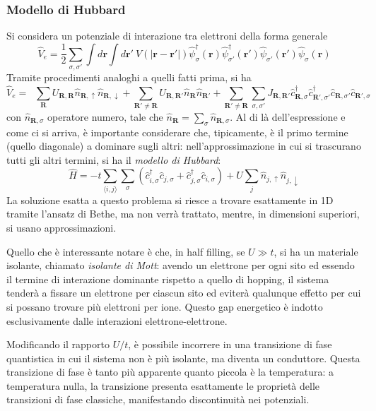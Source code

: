 \documentclass[11pt, a4paper]{scrartcl}
\theoremstyle{style}
\theoremstyle{style1}
\numberwithin{equation}{subsection}
\begin{document}
\subsubsection{Modello di Hubbard}
Si considera un potenziale di interazione tra elettroni della forma generale
\[
\hat{V}_e = \frac{1}{2} \sum_{\sigma ,\sigma '}^{} \int d\mathbf{r}  \int d\mathbf{r} ' \ V\left(\lvert \mathbf{r} -\mathbf{r} ' \rvert \right) \hat{\psi }^\dagger _\sigma (\mathbf{r} ) \hat{\psi }^\dagger _{\sigma '} (\mathbf{r} ') \hat{\psi }_{\sigma '} (\mathbf{r} ') \hat{\psi }_\sigma (\mathbf{r} )
\] 
Tramite procedimenti analoghi a quelli fatti prima, si ha
\[
		\hat{V}_e = \operatorname{}  \sum_{\mathbf{R} }^{} U_{\mathbf{R} ,\mathbf{R} }  \hat{n}_{\mathbf{R} ,  \uparrow} \hat{n}_{\mathbf{R} ,\downarrow}  + \sum_{\mathbf{R} '\neq \mathbf{R} }^{} U_{\mathbf{R} ,\mathbf{R} '} \hat{n}_\mathbf{R} \hat{n}_{\mathbf{R} '} + \sum_{\mathbf{R}' \neq \mathbf{R} }^{} \sum_{\sigma ,\sigma '}^{} J_{\mathbf{R} ,\mathbf{R} '} \hat{c}^\dagger _{\mathbf{R} ,\sigma } \hat{c}^\dagger _{\mathbf{R}' ,\sigma '}  \hat{c}_{\mathbf{R} ,\sigma '} \hat{c}_{\mathbf{R} ' , \sigma } 
\] 
con $\hat{n}_{\mathbf{R} ,\sigma } $ operatore numero, tale che $\hat{n}_\mathbf{R} = \sum_{\sigma }^{} \hat{n}_{\mathbf{R} ,\sigma } $.
Al di l\`a dell'espressione e come ci si arriva, \`e importante considerare che, tipicamente, \`e il primo termine (quello diagonale) a dominare sugli altri: nell'approssimazione in cui si trascurano tutti gli altri termini, si ha il \textit{modello di Hubbard}:
\[
\hat{H}=-t \sum_{\langle i,j \rangle}^{} \sum_{\sigma }^{} \left(\hat{c}^\dagger _{i,\sigma } \hat{c}_{j,\sigma } + \hat{c}^\dagger _{j,\sigma } \hat{c}_{i,\sigma } \right) + U \sum_{j}^{} \hat{n}_{j,\uparrow} \hat{n}_{j,\downarrow} 
\] 
La soluzione esatta a questo problema si riesce a trovare esattamente in 1D tramite l'ansatz di Bethe, ma non verr\`a trattato, mentre, in dimensioni superiori, si usano approssimazioni.

Quello che \`e interessante notare \`e che, in half filling, se $U \gg t$, si ha un materiale isolante, chiamato \textit{isolante di Mott}: avendo un elettrone per ogni sito ed essendo il termine di interazione dominante rispetto a quello di hopping, il sistema tender\`a a fissare un elettrone per ciascun sito ed eviter\`a qualunque effetto per cui si possano trovare pi\`u elettroni per ione.
Questo gap energetico \`e indotto esclusivamente dalle interazioni elettrone-elettrone.

Modificando il rapporto $U / t$, \`e possibile incorrere in una transizione di fase quantistica in cui il sistema non \`e pi\`u isolante, ma diventa un conduttore.
Questa transizione di fase \`e tanto pi\`u apparente quanto piccola \`e la temperatura: a temperatura nulla, la transizione presenta esattamente le propriet\`a delle transizioni di fase classiche, manifestando discontinuit\`a nei potenziali.
\end{document}
